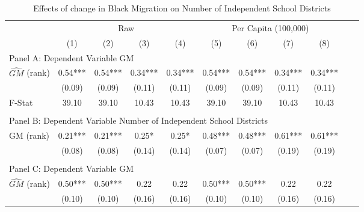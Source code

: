  \begin{table}[htbp]\centering {} \begin{threeparttable} \caption{Effects of change in Black Migration on Number of Independent School Districts} \begin{tabular}{l*{10}{c}} \toprule
                &\multicolumn{4}{c}{Raw}                                    &\multicolumn{4}{c}{Per Capita (100,000)}                   \\\cmidrule(lr){2-5}\cmidrule(lr){6-9}
                &\multicolumn{1}{c}{(1)}   &\multicolumn{1}{c}{(2)}   &\multicolumn{1}{c}{(3)}   &\multicolumn{1}{c}{(4)}   &\multicolumn{1}{c}{(5)}   &\multicolumn{1}{c}{(6)}   &\multicolumn{1}{c}{(7)}   &\multicolumn{1}{c}{(8)}   \\
\cmidrule(lr){1-9}
\multicolumn{8}{l}{Panel A: Dependent Variable GM}\\
\cmidrule(lr){1-9}
$\hat{GM}$ (rank)&       0.54***&       0.54***&       0.34***&       0.34***&       0.54***&       0.54***&       0.34***&       0.34***\\
                &     (0.09)   &     (0.09)   &     (0.11)   &     (0.11)   &     (0.09)   &     (0.09)   &     (0.11)   &     (0.11)   \\
\midrule
F-Stat          &      39.10   &      39.10   &      10.43   &      10.43   &      39.10   &      39.10   &      10.43   &      10.43   \\
\cmidrule[\heavyrulewidth](lr){1-9} \\ \cmidrule[\heavyrulewidth](lr){1-9}
\multicolumn{8}{l}{Panel B: Dependent Variable Number of Independent School Districts}\\
\cmidrule(lr){1-9}
GM  (rank)      &       0.21***&       0.21***&       0.25*  &       0.25*  &       0.48***&       0.48***&       0.61***&       0.61***\\
                &     (0.08)   &     (0.08)   &     (0.14)   &     (0.14)   &     (0.07)   &     (0.07)   &     (0.19)   &     (0.19)   \\
\cmidrule[\heavyrulewidth](lr){1-9} \\ \cmidrule[\heavyrulewidth](lr){1-9}
\multicolumn{8}{l}{Panel C: Dependent Variable GM}\\
\cmidrule(lr){1-9}
$\hat{GM}$ (rank)&       0.50***&       0.50***&       0.22   &       0.22   &       0.50***&       0.50***&       0.22   &       0.22   \\
                &     (0.10)   &     (0.10)   &     (0.16)   &     (0.16)   &     (0.10)   &     (0.10)   &     (0.16)   &     (0.16)   \\

\end{tabular}
\end{threeparttable}
\end{table}
